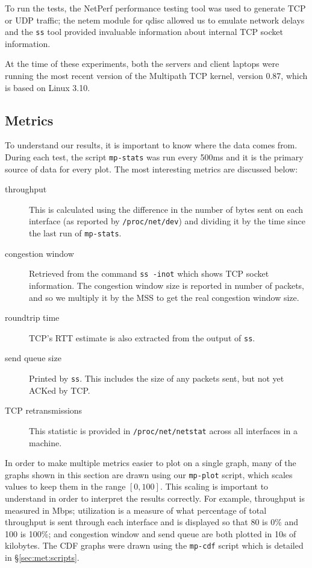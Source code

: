 To run the tests, the NetPerf performance testing tool was used to generate TCP or UDP traffic; the netem
module for qdisc allowed us to emulate network delays and the \texttt{ss} tool provided
invaluable information about internal TCP socket information.

At the time of these experiments, both the servers and client laptops were running the
most recent version of the Multipath TCP kernel, version 0.87, which is based
on Linux 3.10.

\subsection{Metrics}
\label{sec:met:metrics}
To understand our results, it is important to know where the data comes from.
During each test, the script \texttt{mp-stats} was run every 500ms and it is the
primary source of data for every plot. The most interesting metrics are
discussed below:

\begin{description}
  \item[throughput]
    This is calculated using the difference in the number of bytes
    sent on each interface (as reported by \texttt{/proc\-/net/\-dev}) and
    dividing it by the time since the last run of \texttt{mp-stats}.
  \item[congestion window]
    Retrieved from the command \texttt{ss -inot} which shows TCP socket
    information. The congestion window size is reported in number of packets,
    and so we multiply it by the MSS to get the real congestion window size.
  \item[roundtrip time]
    TCP's RTT estimate is also extracted from the output of \texttt{ss}.
  \item[send queue size]
    Printed by \texttt{ss}. This includes the size of any packets sent, but not yet ACKed
    by TCP.
  \item[TCP retransmissions]
    This statistic is provided in \texttt{/proc\-/net/\-netstat} across all interfaces in a machine.
\end{description}

In order to make multiple metrics easier to plot on a single graph, many of the
graphs shown in this section are drawn using our \texttt{mp-plot} script, which
scales values to keep them in the range $[0,100]$. This scaling is important to
understand in order to interpret the results correctly. For example, throughput
is measured in Mbps; utilization is a measure of what percentage of total
throughput is sent through each interface and is displayed so that 80 is
0\% and 100 is 100\%; and congestion window and send queue are both plotted in
10s of kilobytes. The CDF graphs were drawn using the \texttt{mp-cdf} script
which is detailed in \S\ref{sec:met:scripts}.

